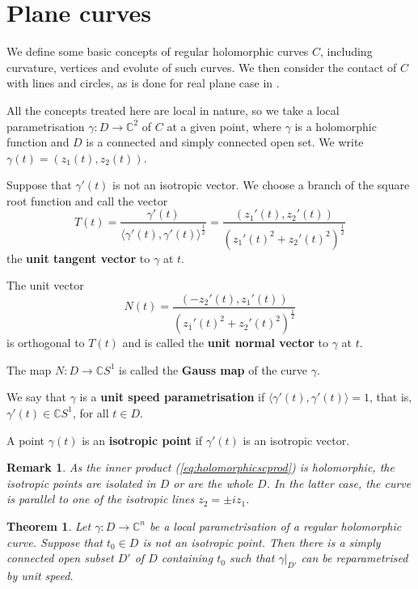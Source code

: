 \documentclass[12pt,a4paper]{article}
\newtheorem{theo}[prop]{Theorem}
\newtheorem{rem}[prop]{Remark}
\begin{document}
\section{Plane curves}\label{sec:planecurves}

We define some basic concepts of regular holomorphic curves $C$, including curvature, vertices and evolute of such curves. We then consider the contact of  $C$ with lines and circles, as is done for real plane case in \cite{BG}.

All the concepts treated here are local in nature, so we take a local parametrisation 
 $\gamma: D\to \mathbb C^2$ of $C$ at a given point, where $\gamma$ is a holomorphic function and $D$ 
 is a connected and simply connected open set. We write $\gamma(t)=(z_1(t), z_2(t))$.


Suppose that $\gamma'(t)$ is not an isotropic vector. We choose a branch of the square root function 
and call the vector
$$
T(t)=\frac{\gamma'(t)}{\langle \gamma'(t), {\gamma'(t)}\rangle^{\frac12}}=\frac{(z_1'(t),z_2'(t))}{(z_1'(t)^2+z_2'(t)^2)^{\frac12}}
$$
the {\bf unit tangent vector} to $\gamma$ at $t$.

The unit vector 
$$
N(t)=\frac{(-z_2'(t),z_1'(t))}{(z_1'(t)^2+z_2'(t)^2)^{\frac12}} 
$$
is orthogonal to $T(t)$ and is called the {\bf unit normal vector} to $\gamma$ at $t$. 

The map $N:D\to \mathbb CS^1$ is called the {\bf Gauss map} of the curve $\gamma$. 

We say that $\gamma$ is a {\bf unit speed parametrisation} if $\langle \gamma'(t), {\gamma'(t)}\rangle=1$, that is, $\gamma'(t)\in \mathbb CS^1$, for all $t\in D$.

A point $\gamma(t)$ is an {\bf isotropic point} if $\gamma'(t)$ is an isotropic vector.


\begin{rem}
{\rm 
As the inner product (\ref{eq:holomorphicscprod}) is holomorphic, the isotropic points are isolated in $D$ or are the whole $D$. In the latter case, the curve is parallel to one of the isotropic lines $z_2=\pm iz_1$.
}
\end{rem}


\begin{theo}\label{theo:unitspeed}
Let $\gamma:D\to \mathbb C^n$ be a local parametrisation of a regular holomorphic curve. 
Suppose that $t_0\in D$ is not an isotropic point. Then there is a simply connected open subset $D'$ of $D$ containing $t_0$ such that $\gamma|_{D'}$ can 
be reparametrised by unit speed.
\end{theo}
\end{document}
